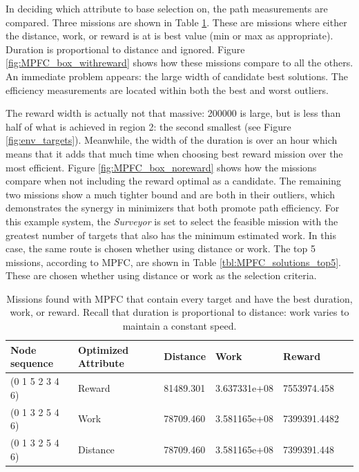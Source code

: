 \documentclass{tamuccthesis}
\begin{document}
In deciding which attribute to base selection on, the path measurements are compared. Three missions are shown in Table \ref{tbl:MPFC_solutions}. These are missions where either the distance, work, or reward is at is best value (min or max as appropriate). Duration is proportional to distance and ignored. Figure \ref{fig:MPFC_box_withreward} shows how these missions compare to all the others. An immediate problem appears: the large width of candidate best solutions. The efficiency measurements are located within both the best and worst outliers. 

The reward width is actually not that massive: 200000 is large, but is less than half of what is achieved in region 2: the second smallest (see Figure \ref{fig:env_targets}). Meanwhile, the width of the duration is over an hour which means that it adds that much time when choosing best reward mission over the most efficient. Figure \ref{fig:MPFC_box_noreward} shows how the missions compare when not including the reward optimal as a candidate. The remaining two missions show a much tighter bound and are both in their outliers, which demonstrates the synergy in minimizers that both promote path efficiency. For this example system, the \textit{Surveyor} is set to select the feasible mission with the greatest number of targets that also has the minimum estimated work. In this case, the same route is chosen whether using distance or work. The top 5 missions, according to MPFC, are shown in Table \ref{tbl:MPFC_solutions_top5}. These are chosen whether using distance or work as the selection criteria.

\begin{table}[H]\small
    \begin{tabular}{|l|l|l|l|l|l|}
\hline
Node sequence & Optimized Attribute & Distance & Work & Reward \\
\hline
(0 1 5 2 3 4 6) & Reward   & 81489.301 & 3.637331e+08 & 7553974.458 \\
\hline
(0 1 3 2 5 4 6) & Work     & 78709.460 & 3.581165e+08 & 7399391.4482 \\
\hline
(0 1 3 2 5 4 6) & Distance & 78709.460 & 3.581165e+08  & 7399391.448 \\
\hline
    \end{tabular}
    \caption[Mission Planner Fully-Connected results.]{Missions found with MPFC that contain every target and have the best duration, work, or reward. Recall that duration is proportional to distance: work varies to maintain a constant speed.}
    \label{tbl:MPFC_solutions}
\end{table}
\end{document}
